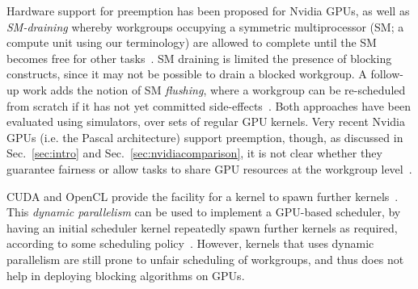 \documentclass[sigconf]{acmart}
\newcommand{\ADComment}[1]{\textcolor{green}{AD: #1}}
\newcommand{\mysec}{Sec.~}
\newcommand{\nvidia}{Nvidia\xspace}
\begin{document}
{
%
%
Hardware support for preemption has been proposed for \nvidia GPUs, as
well as \emph{SM-draining} whereby workgroups occupying a symmetric
multiprocessor (SM; a compute unit using our terminology) are allowed
to complete until the SM becomes free for other
tasks~\cite{DBLP:conf/isca/TanasicGCRNV14}.  SM draining is limited
the presence of blocking constructs, since it may not be possible to
drain a blocked workgroup.
%
A follow-up work adds the notion of SM \emph{flushing}, where a
workgroup can be re-scheduled from scratch if it has not yet committed
side-effects~\cite{DBLP:conf/asplos/ParkPM15}.  Both approaches have
been evaluated using simulators, over sets of regular GPU kernels.
Very recent \nvidia GPUs (i.e. the Pascal architecture) support
preemption, though, as discussed in \mysec{\ref{sec:intro}} and
\mysec{\ref{sec:nvidiacomparison}}, it is not clear whether they guarantee
fairness or allow tasks to share GPU resources at the workgroup
level~\cite{PascalWhitepaper}.

CUDA and OpenCL provide the facility for a kernel to spawn further
kernels~\cite{cuda-75}.  This \emph{dynamic parallelism} can be used
to implement a GPU-based scheduler, by having an initial scheduler
kernel repeatedly spawn further kernels as required, according to some
scheduling policy~\cite{DBLP:conf/ppopp/Muyan-OzcelikO16}.  However,
kernels that uses dynamic parallelism are still prone to unfair
scheduling of workgroups, and thus does not help in deploying blocking
algorithms on GPUs.


%



}
\end{document}
